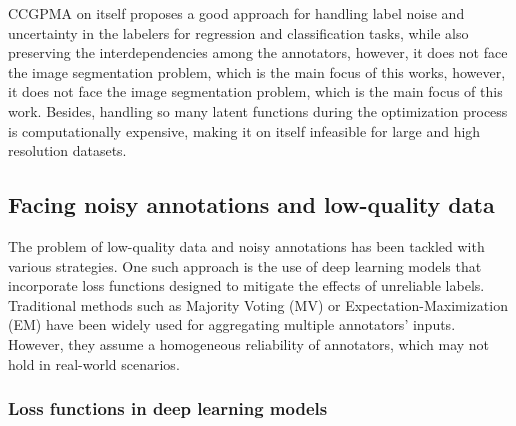 \gls{CCGPMA} on itself proposes a good approach for handling label
noise and uncertainty in the labelers for regression and
classification tasks, while also preserving the interdependencies
among the annotators, however, it does not face the image segmentation
problem, which is the main focus of this works, however, it does not
face the image segmentation problem, which is the main focus of this
work. Besides, handling so many latent functions during the
optimization process is computationally expensive, making it on itself
infeasible for large and high resolution datasets.

\subsection{Facing noisy annotations and low-quality data}

The problem of low-quality data and noisy annotations has been
tackled with various strategies. One such approach is the use of deep
learning models that incorporate loss functions designed to mitigate
the effects of unreliable labels. Traditional methods such as
Majority Voting (MV) or Expectation-Maximization (EM) have been
widely used for aggregating multiple annotators' inputs. However,
they assume a homogeneous reliability of annotators, which may not
hold in real-world scenarios.

\subsubsection{Loss functions in deep learning models}

